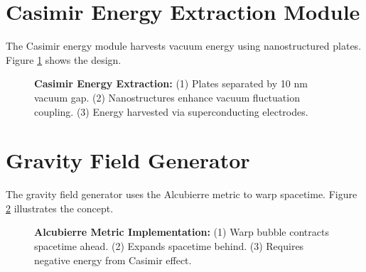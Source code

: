 \documentclass[12pt, a4paper]{article}
\begin{document}
\section{Casimir Energy Extraction Module}
The Casimir energy module harvests vacuum energy using nanostructured plates. Figure \ref{fig:casimir_energy} shows the design.

\begin{figure}[H]
\centering
{}
\caption{
\textbf{Casimir Energy Extraction:} 
(1) Plates separated by 10 nm vacuum gap. 
(2) Nanostructures enhance vacuum fluctuation coupling. 
(3) Energy harvested via superconducting electrodes.
}
\label{fig:casimir_energy}
\end{figure}

\section{Gravity Field Generator}
The gravity field generator uses the Alcubierre metric to warp spacetime. Figure \ref{fig:gravity_field} illustrates the concept.

\begin{figure}[H]
\centering
{}
\caption{
\textbf{Alcubierre Metric Implementation:} 
(1) Warp bubble contracts spacetime ahead. 
(2) Expands spacetime behind. 
(3) Requires negative energy from Casimir effect.
}
\label{fig:gravity_field}
\end{figure}
\end{document}
